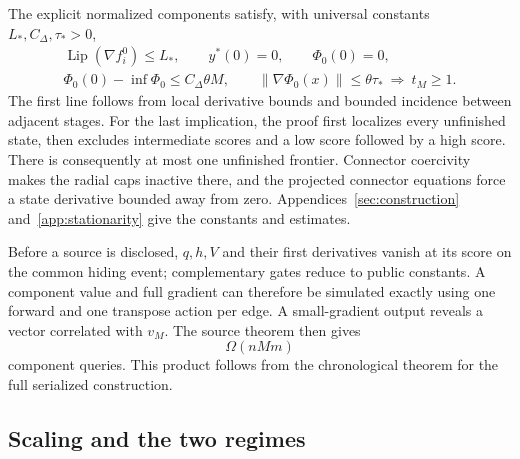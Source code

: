 \documentclass[11pt,letterpaper]{article}
\theoremstyle{definition}
\theoremstyle{remark}
\begin{document}
The explicit normalized components satisfy, with universal constants
$L_*,C_\Delta,\tau_*>0$,
\begin{equation}
\begin{gathered}
 \operatorname{Lip}(\nabla f_i^0)\le L_*,\qquad
 y^*(0)=0,\qquad \Phi_0(0)=0,\\
 \Phi_0(0)-\inf\Phi_0\le C_\Delta\theta M,\qquad
 \|\nabla\Phi_0(x)\|\le\theta\tau_*
       \ \Longrightarrow\ t_M\ge1.
\end{gathered}
\label{eq:overview-interface}
\end{equation}
The first line follows from local derivative bounds and bounded incidence
between adjacent stages. For the last implication, the proof first
localizes every unfinished state, then excludes intermediate scores and a
low score followed by a high score. There is consequently at most one
unfinished frontier. Connector coercivity makes the radial caps inactive
there, and the projected connector equations force a state derivative
bounded away from zero. Appendices~\ref{sec:construction}
and~\ref{app:stationarity} give the constants and estimates.

Before a source is disclosed, $q,h,V$ and their first derivatives vanish
at its score on the common hiding event; complementary gates reduce to
public constants. A component value
and full gradient can therefore be simulated exactly using one forward and
one transpose action per edge. A small-gradient output reveals a vector
correlated with $v_M$. The source theorem then gives
\begin{equation}
 \Omega(nMm)
 \label{eq:overview-information-cost}
\end{equation}
component queries. This product follows from the chronological theorem
for the full serialized construction.

\subsection{Scaling and the two regimes}
\end{document}
